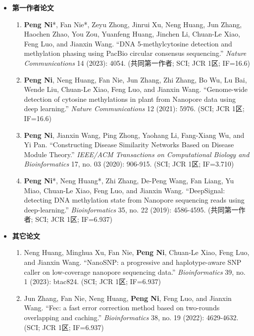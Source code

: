 \documentclass[zh]{resume}
\begin{document}
\begin{itemize}
  \item \textbf{第一作者论文}
  \begin{enumerate}
    \item \textbf{Peng Ni}*, Fan Nie*, Zeyu Zhong, Jinrui Xu, Neng Huang, Jun Zhang, Haochen Zhao, You Zou, Yuanfeng Huang, Jinchen Li, Chuan-Le Xiao, Feng Luo, and Jianxin Wang. \enquote{DNA 5-methylcytosine detection and methylation phasing using PacBio circular consensus sequencing.} {\it Nature Communications} 14 (2023): 4054. (共同第一作者; SCI; JCR 1区; IF=16.6)
    \item \textbf{Peng Ni}, Neng Huang, Fan Nie, Jun Zhang, Zhi Zhang, Bo Wu, Lu Bai, Wende Liu, Chuan-Le Xiao, Feng Luo, and Jianxin Wang. \enquote{Genome-wide detection of cytosine methylations in plant from Nanopore data using deep learning.} {\it Nature Communications} 12 (2021): 5976. (SCI; JCR 1区; IF=16.6)
    \item \textbf{Peng Ni}, Jianxin Wang, Ping Zhong, Yaohang Li, Fang-Xiang Wu, and Yi Pan. \enquote{Constructing Disease Similarity Networks Based on Disease Module Theory.} {\it IEEE/ACM Transactions on Computational Biology and Bioinformatics} 17, no. 03 (2020): 906-915. (SCI; JCR 1区; IF=3.710)
    \item \textbf{Peng Ni}*, Neng Huang*, Zhi Zhang, De-Peng Wang, Fan Liang, Yu Miao, Chuan-Le Xiao, Feng Luo, and Jianxin Wang. \enquote{DeepSignal: detecting DNA methylation state from Nanopore sequencing reads using deep-learning.} {\it Bioinformatics} 35, no. 22 (2019): 4586-4595. (共同第一作者; SCI; JCR 1区; IF=6.937)
  \end{enumerate}
  \medskip
  \item \textbf{其它论文}
  \begin{enumerate}
    \item Neng Huang, Minghua Xu, Fan Nie, \textbf{Peng Ni}, Chuan-Le Xiao, Feng Luo, and Jianxin Wang. \enquote{NanoSNP: a progressive and haplotype-aware SNP caller on low-coverage nanopore sequencing data.} {\it Bioinformatics} 39, no. 1 (2023): btac824. (SCI; JCR 1区; IF=6.937)
    \item Jun Zhang, Fan Nie, Neng Huang, \textbf{Peng Ni}, Feng Luo, and Jianxin Wang. \enquote{Fec: a fast error correction method based on two-rounds overlapping and caching.} {\it Bioinformatics} 38, no. 19 (2022): 4629-4632. (SCI; JCR 1区; IF=6.937)

\end{enumerate}
\end{itemize}
\end{document}
